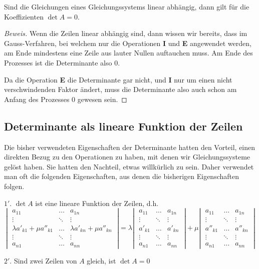 \begin{hilfssatz}
\label{detlinabh}
Sind die Gleichungen eines Gleichungssystems linear abhängig, dann
gilt für die Koeffizienten $\det A=0$.
\end{hilfssatz}
\begin{proof}[Beweis]
Wenn die Zeilen linear abhängig sind, dann wissen wir bereits, dass
im Gauss-Verfahren, bei welchem nur die Operationen {\bf I} und {\bf E}
angewendet werden, am Ende mindestens eine Zeile aus lauter
Nullen auftauchen muss.
Am Ende des Prozesses ist die Determinante also $0$.

Da die Operation {\bf E} die Determinante gar nicht,
und {\bf I} nur um einen nicht verschwindenden Faktor ändert, muss
die Determinante also auch schon am Anfang des Prozesses $0$ gewesen
sein.
\end{proof}

\subsection{Determinante als lineare Funktion der Zeilen\label{detlinfun}}
Die bisher verwendeten Eigenschaften der Determinante hatten den
Vorteil, einen direkten Bezug zu den Operationen zu haben, mit 
denen wir Gleichungssysteme gelöst haben.
Sie hatten den Nachteil, etwas willkürlich zu sein.
Daher verwendet man oft die folgenden Eigenschaften, aus denen
die bisherigen Eigenschaften folgen.

\begin{compactenum}
\item[$1'$.] $\det A$ ist eine lineare Funktion der Zeilen, d.h.
\[
\left|
\;
\begin{matrix}
a_{11}&\dots&a_{1n}\\
\vdots&\ddots&\vdots\\
\lambda a'_{k1}+\mu a''_{k1}&\dots&\lambda a'_{kn}+\mu a''_{kn}\\
\vdots&\ddots&\vdots\\
a_{n1}&\dots&a_{nn}
\end{matrix}
\;
\right|
=
\lambda
\left|
\;
\begin{matrix}
a_{11}&\dots&a_{1n}\\
\vdots&\ddots&\vdots\\
a'_{k1}&\dots&a'_{kn}\\
\vdots&\ddots&\vdots\\
a_{n1}&\dots&a_{nn}
\end{matrix}
\;
\right|
+
\mu
\left|
\;
\begin{matrix}
a_{11}&\dots&a_{1n}\\
\vdots&\ddots&\vdots\\
a''_{k1}&\dots&a''_{kn}\\
\vdots&\ddots&\vdots\\
a_{n1}&\dots&a_{nn}
\end{matrix}
\;
\right|
\]
\item[$2'$.] Sind zwei Zeilen von $A$ gleich, ist $\det A=0$
\end{compactenum}

